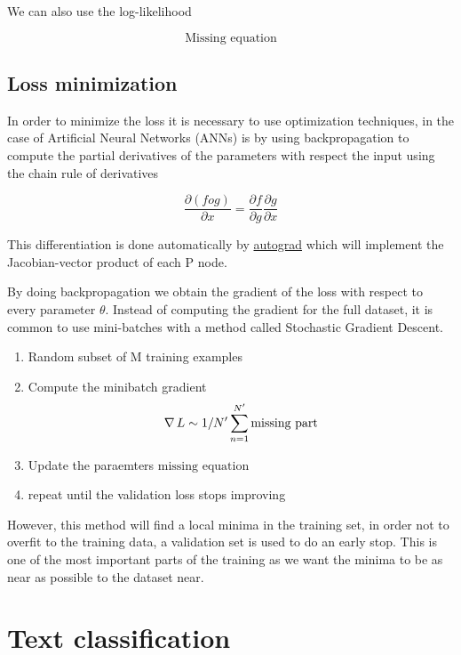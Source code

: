 \documentclass[b5paper]{report}
\begin{document}
We can also use the log-likelihood

\begin{equation}
  \text{Missing equation}
\end{equation}

\subsection{Loss minimization}

In order to minimize the loss it is necessary to use optimization techniques,
in the case of Artificial Neural Networks (ANNs) is by using backpropagation to
compute the partial derivatives of the parameters with respect the input using
the chain rule of derivatives

\begin{equation}
  \frac{\partial(f o g)}{\partial x} = \frac{\partial f}{\partial
  g}\frac{\partial g}{\partial x}
\end{equation}

This differentiation is done automatically by
\href{https://github.com/HIPS/autograd}{autograd} which will implement the
Jacobian-vector product of each P node.

By doing backpropagation we obtain the gradient of the loss with respect to
every parameter $\theta$. Instead of computing the gradient for the full
dataset, it is common to use mini-batches with a method called Stochastic
Gradient Descent.

\begin{enumerate}
  \item Random subset of M training examples
  \item Compute the minibatch gradient
    \begin{equation}
      \operatorname*{\nabla} L \sim 1/N' \sum_{n=1}^{N'} \text{missing part}
    \end{equation}
  \item Update the paraemters $\text{missing equation}$
  \item repeat until the validation loss stops improving
\end{enumerate}

However, this method will find a local minima in the training set, in order not
to overfit to the training data, a validation set is used to do an early stop.
This is one of the most important parts of the training as we want the minima
to be as near as possible to the dataset near.

\section{Text classification}
\end{document}
